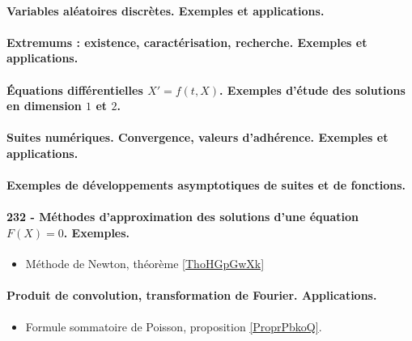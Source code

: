 \paragraph{Variables aléatoires discrètes. Exemples et applications.}
\paragraph{Extremums : existence, caractérisation, recherche. Exemples et applications.}
\paragraph{Équations différentielles $X' = f (t , X )$. Exemples d’étude des solutions en dimension $1$ et $2$.}
\paragraph{Suites numériques. Convergence, valeurs d’adhérence. Exemples et applications.}
\paragraph{Exemples de développements asymptotiques de suites et de fonctions.}
\paragraph{232 - Méthodes d'approximation des solutions d’une équation $F(X)=0$. Exemples.}
\begin{itemize}
    \item Méthode de Newton, théorème \ref{ThoHGpGwXk}
\end{itemize}
\paragraph{Produit de convolution, transformation de Fourier. Applications.}
\begin{itemize}
    \item Formule sommatoire de Poisson, proposition \ref{ProprPbkoQ}.
\end{itemize}
